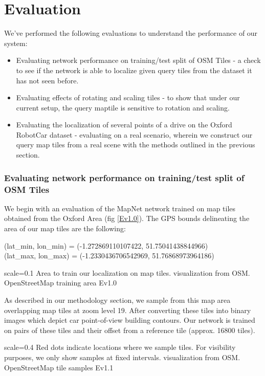 
\chapter{Evaluation}
We've performed the following evaluations to understand the performance of our system:
\begin{itemize}	
\item Evaluating network performance on training/test split of OSM Tiles - a check to see if the network is able to localize given query tiles from the dataset it has not seen before. \\
\item Evaluating effects of rotating and scaling tiles - to show that under our current setup, the query maptile is sensitive to rotation and scaling.\\
\item Evaluating the localization of several points of a drive on the Oxford RobotCar dataset - evaluating on a real scenario, wherein we construct our query map tiles from a real scene with the methods outlined in the previous section. 
\end{itemize}
\subsection{Evaluating network performance on training/test split of OSM Tiles}
We begin with an evaluation of the MapNet network trained on map tiles obtained from the Oxford Area (fig \ref{Ev1.0}). The GPS bounds delineating the area of our map tiles are the following:

(lat\_min, lon\_min) = (-1.272869110107422, 51.75041438844966)\\
(lat\_max, lon\_max) = (-1.2330436706542969, 51.76868973964186)

{scale=0.1}%
{Area to train our localization on map tiles. visualization from OSM.}%
{OpenStreetMap training area}%
{Ev1.0}

As described in our methodology section, we sample from this map area overlapping map tiles at zoom level 19. After converting these tiles into binary images which depict car point-of-view building contours. Our network is trained on pairs of these tiles and their offset from a reference tile (approx. 16800 tiles).

{scale=0.4}%
{Red dots indicate locations where we sample tiles. For visibility purposes, we only show samples at fixed intervals. visualization from OSM.}%
{OpenStreetMap tile samples}%
{Ev1.1}

